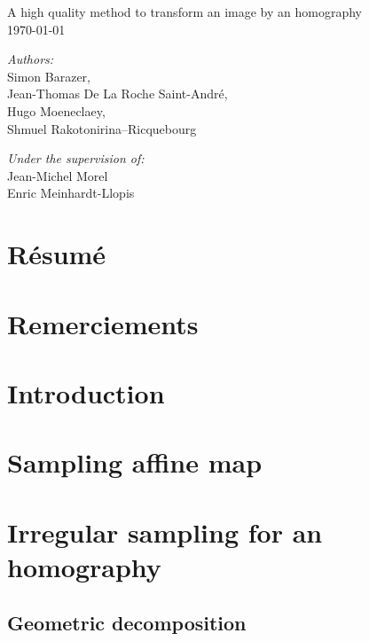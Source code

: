 \documentclass[a4paper,11pt]{article}
\theoremstyle{plain}
\theoremstyle{definition}
\theoremstyle{remark}
\begin{document}
   	\begin{titlepage}
	\begin{center}
	\vspace*{\fill}

		\vspace{0.3cm}
		{\huge A high quality method to transform an image by an homography}\\
		\vspace{1.5cm}
	\today
	\vspace{1.5cm}


		\large
			\emph{Authors:}\\
			Simon Barazer,\\
			Jean-Thomas De La Roche Saint-André,\\
			Hugo Moeneclaey, \\
			Shmuel Rakotonirina--Ricquebourg
		
\medbreak
\medbreak
\medbreak
\medbreak
\medbreak
\medbreak

		\large
			\emph{Under the supervision of:}\\ 
			Jean-Michel Morel \\
			Enric Meinhardt-Llopis
		


	\vfill
	\end{center}
   	\section*{Résumé}
   		
	\end{titlepage}
	\tableofcontents
		\section*{Remerciements}
	\section*{Introduction}%
		
	\section{Sampling affine map}
		\label{Exposition_du_probleme}
		\label{szeliski_section}
	\section{Irregular sampling for an homography}
		\label{decomp_geo_hom}
		\subsection{Geometric decomposition}
\end{document}
